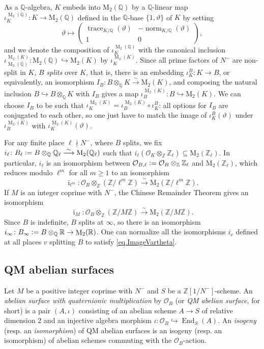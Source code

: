 \documentclass[a4paper]{amsart}
\numberwithin{equation}{section}
\theoremstyle{definition}
\newcommand{\Q}{\mathbb{Q}}
\newcommand{\Z}{\mathbb{Z}}
\newcommand{\R}{\mathbb{R}}
\newcommand{\defeq}{\vcentcolon=}
\DeclareMathOperator{\End}{End}
\DeclareMathOperator{\M}{M}
\begin{document}
As a $\Q$-algebra, $K$ embeds into $\mathrm{M}_2(\Q)$ by a $\Q$-linear map $\iota_K^{\M_2(\Q)}\colon K\to\mathrm{M}_2(\Q)$ defined in the $\Q$-base $\{1,\vartheta\}$ of $K$ by setting
\begin{equation}\label{eq.ImageVartheta}
\vartheta\longmapsto\begin{pmatrix}\operatorname{trace}_{K/\Q}(\vartheta) & -\operatorname{norm}_{K/\Q}(\vartheta) \\ 1 & 0\end{pmatrix},
\end{equation}
and we denote the composition of $\iota_K^{\M_2(\Q)}$ with the canonical inclusion $\iota_{\M_2(\Q)}^{\M_2(K)}\colon\mathrm{M}_2(\Q)\hookrightarrow\mathrm{M}_2(K)$ by $\iota_K^{\M_2(K)}$. Since all prime factors of $N^{-}$ are non-split in $K$, $B$ \textit{splits} over $K$, that is, there is an embedding $\iota_K^B\colon K\to B$, or equivalently, an isomorphism $I_B\colon B\otimes_{\Q} K\stackrel{\sim}{\longrightarrow}\mathrm{M}_2(K)$, and composing the natural inclusion $B\hookrightarrow B\otimes_{\Q} K$ with $I_B$ gives a map $\iota_B^{\M_2(K)}\colon B\hookrightarrow\mathrm{M}_2(K)$. We can choose $I_B$ to be such that $\iota_K^{\M_2(K)}=\iota_B^{\M_2(K)}\circ\iota_K^B$: all options for $I_B$ are conjugated to each other, so one just have to match the image of $\iota_K^B(\vartheta)$ under $\iota_B^{\M_2(K)}$ with $\iota_K^{\M_2(K)}(\vartheta)$.

For any finite place $\ell\nmid N^{-}$, where $B$ splits, we fix $i_\ell\colon B_\ell\defeq B\otimes_{\Q}\Q_\ell\stackrel{\sim}{\longrightarrow}\mathrm{M}_2(\Q_\ell)$ such that $i_\ell(\mathcal{O}_K\otimes_{\Z}\Z_\ell)\subseteq\mathrm{M}_2(\Z_\ell)$. In particular, $i_\ell$ is an isomorphism between $\mathcal{O}_{B,\ell}\defeq\mathcal{O}_{B}\otimes_{\Z}\Z_\ell$ and $\mathrm{M}_2(\Z_\ell)$, which reduces modulo $\ell^m$ for all $m\ge 1$ to an isomorphism \[\bar{\imath}_{\ell^m}\colon\mathcal{O}_B\otimes_{\Z}(\Z/\ell^m\Z)\stackrel{\sim}{\longrightarrow}\mathrm{M}_2(\Z/\ell^m\Z).\]
If $M$ is an integer coprime with $N^{-}$, the Chinese Remainder Theorem gives an isomorphism \[\bar{\imath}_M\colon \mathcal{O}_B\otimes_{\Z}(\Z/M\Z)\stackrel{\sim}{\longrightarrow}\mathrm{M}_2(\Z/M\Z).\]
Since $B$ is indefinite, $B$ splits at $\infty$, so there is an isomorphism $i_\infty\colon B_\infty\defeq B\otimes_{\Q}\R\to\M_2(\R)$. One can normalize all the isomorphisms $i_v$ defined at all places $v$ splitting $B$ to satisfy \eqref{eq.ImageVartheta}.

\subsection{QM abelian surfaces}\label{subsec.QMAbelianSurfaces}
Let $M$ be a positive integer coprime with $N^{-}$ and $S$ be a $\Z[1/N^{-}]$-scheme. An \textit{abelian surface with quaternionic multiplication} by $\mathcal{O}_B$ (or \textit{QM abelian surface}, for short) is a pair $(A,\iota)$ consisting of an abelian scheme $A\to S$ of relative dimension 2 and an injective algebra morphism $\iota\colon\mathcal{O}_B\hookrightarrow\End_S(A)$. An \emph{isogeny} (resp. an \emph{isomorphism}) of QM abelian surfaces is an isogeny (resp. an isomorphism) of abelian schemes commuting with the $\mathcal{O}_B$-action.
\end{document}
